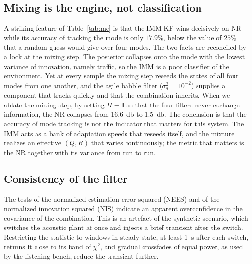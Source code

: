 \documentclass[conference]{IEEEtran}
\begin{document}
\subsection{Mixing is the engine, not classification}
A striking feature of Table~\ref{tab:mc} is that the IMM-KF wins decisively on NR
while its accuracy of tracking the mode is only $17.9\%$, below the value of $25\%$
that a random guess would give over four modes. The two facts are reconciled by a
look at the mixing step. The posterior collapses onto the mode with the lowest
variance of innovation, namely traffic, so the IMM is a poor classifier of the
environment. Yet at every sample the mixing step reseeds the states of all four
modes from one another, and the agile babble filter ($\sigma_q^2=10^{-2}$) supplies
a component that tracks quickly and that the combination inherits. When we ablate the
mixing step, by setting $\Pi=\mathbf{I}$ so that the four filters never exchange
information, the NR collapses from \SI{+16.6}{\decibel} to \SI{+1.5}{\decibel}. The
conclusion is that the accuracy of mode tracking is not the indicator that matters
for this system. The IMM acts as a bank of adaptation speeds that reseeds itself,
and the mixture realizes an effective $(Q,R)$ that varies continuously; the metric
that matters is the NR together with its variance from run to run.

\subsection{Consistency of the filter}
The tests of the normalized estimation error squared (NEES) and of the normalized
innovation squared (NIS) indicate an apparent overconfidence in the covariance of
the combination. This is an artefact of the synthetic scenario, which switches the
acoustic plant at once and injects a brief transient after the switch. Restricting
the statistic to windows in steady state, at least \SI{1}{\second} after each switch,
returns it close to its band of $\chi^2$, and gradual crossfades of equal power,
as used by the listening bench, reduce the transient further.
\end{document}
